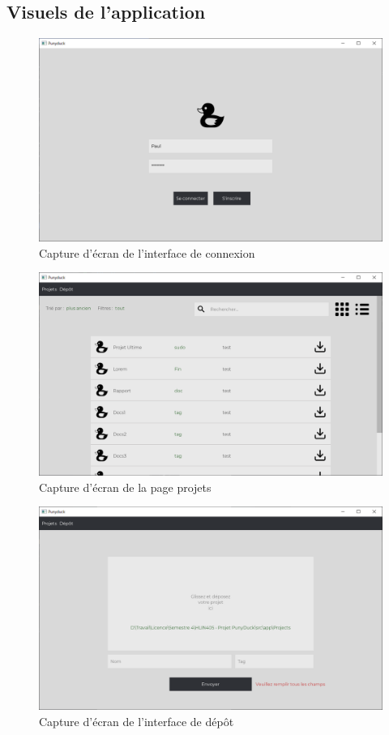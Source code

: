\documentclass{report}
\begin{document}
\begin{appendix}
\chapter{Visuels de l'application}
\begin{figure}[!h]
    \centering 
    \includegraphics[scale=0.2]{punyduck-img-1.png}
    \caption{Capture d'écran de l'interface de connexion}
    \label{Connexion}
\end{figure}
\begin{figure}
    \centering
    \includegraphics[scale=0.2]{punyduck-img-2.png}
    \caption{Capture d'écran de la page projets}
    \label{Projets}
\end{figure}
\begin{figure}
    \centering
    \includegraphics[scale=0.2]{punyduck-img-4.png}
    \caption{Capture d'écran de l'interface de dépôt}
    \label{Depot}
\end{figure}


\end{appendix}
\end{document}
